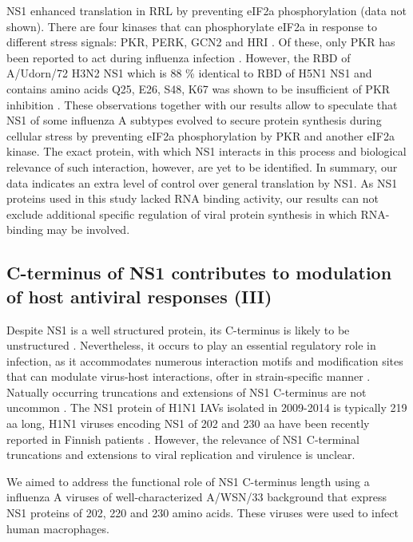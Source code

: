 		NS1 enhanced translation in RRL by preventing \gls{eIF2a} phosphorylation (data not shown). There are four kinases that can phosphorylate \gls{eIF2a} in response to different stress signals: \gls{PKR}, \gls{PERK}, \gls{GCN2} and \gls{HRI} \parencite{Donnelly2013}. Of these, only \gls{PKR} has been reported to act during influenza infection \parencite{Garcia2006}. However, the RBD of A/Udorn/72 H3N2 NS1 which is 88 \% identical to RBD of H5N1 NS1 and contains amino acids Q25, E26, S48, K67 was shown to be insufficient of \gls{PKR} inhibition \parencite{Min2007}. These observations together with our results allow to speculate that \gls{NS1} of some influenza A subtypes evolved to secure protein synthesis during cellular stress by preventing \gls{eIF2a} phosphorylation by PKR and another \gls{eIF2a} kinase. The exact protein, with which NS1 interacts in this process and biological relevance of such interaction, however, are yet to be identified.	In summary, our data indicates an extra level of control over general translation by NS1. As NS1 proteins used in this study lacked RNA binding activity, our results can not exclude additional specific regulation of viral protein synthesis in which RNA-binding may be involved.
		
	\subsection{C-terminus of NS1 contributes to modulation of host antiviral responses (III)}
		
		Despite NS1 is a well structured protein, its C-terminus is likely to be unstructured \parencite{Hale2008b}. Nevertheless, it occurs to play an essential regulatory role in infection, as it accommodates numerous interaction motifs and modification sites that can modulate virus-host interactions, ofter in strain-specific manner \parencite{Liu2010, Marazzi2012, Li2001, Melen2012, Hsiang2012, Hsiang2009}. Natually occurring truncations and extensions of NS1 C-terminus are not uncommon \parencite{Suarez1998}. The NS1 protein of H1N1 IAVs isolated in 2009-2014 is typically 219 aa long, H1N1 viruses encoding NS1 of 202 and 230 aa have been recently reported in Finnish patients \parencite{Lakspere2014}. However, the relevance of NS1 C-terminal truncations and extensions to viral replication and virulence is unclear.
		
		We aimed to address the functional role of NS1 C-terminus length using a influenza A viruses of well-characterized A/WSN/33 background that express NS1 proteins of 202, 220 and 230 amino acids. These viruses were used to infect human macrophages.
		

